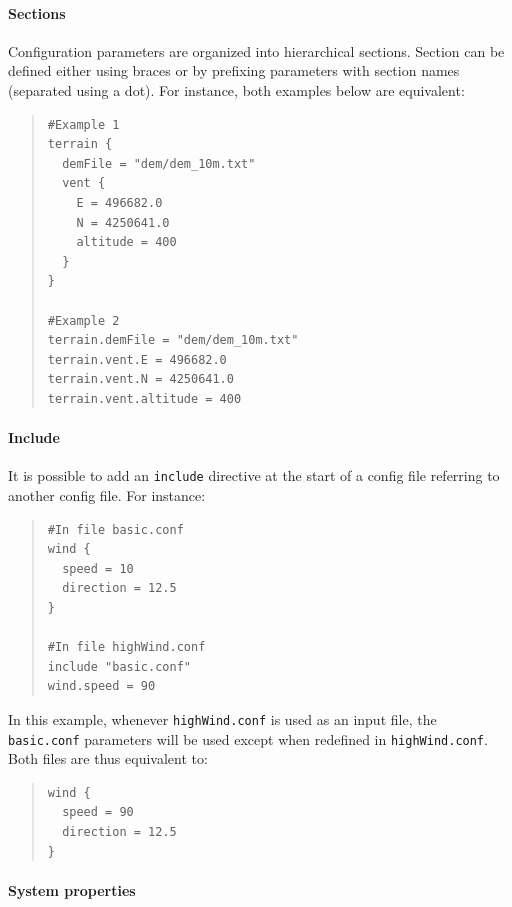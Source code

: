 \documentclass[10pt,a4paper]{article}
\begin{document}
\paragraph{Sections}
\label{sec-4-1-2}

Configuration parameters are organized into hierarchical sections. Section can be defined
either using braces or by prefixing parameters with section names (separated using a dot).
For instance, both examples below are equivalent:

\begin{quote}
\begin{verbatim}
#Example 1
terrain {
  demFile = "dem/dem_10m.txt"
  vent {
    E = 496682.0
    N = 4250641.0
    altitude = 400
  }
}

#Example 2
terrain.demFile = "dem/dem_10m.txt"
terrain.vent.E = 496682.0
terrain.vent.N = 4250641.0
terrain.vent.altitude = 400
\end{verbatim}
\end{quote}

\paragraph{Include}
\label{sec-4-1-3}

It is possible to add an \texttt{include} directive at the start of a config file referring
to another config file. For instance:

\begin{quote}
\begin{verbatim}
#In file basic.conf
wind {
  speed = 10
  direction = 12.5
}

#In file highWind.conf
include "basic.conf"
wind.speed = 90
\end{verbatim}
\end{quote}

In this example, whenever \texttt{highWind.conf} is used as an input file,
the \texttt{basic.conf} parameters will be used except when redefined in \texttt{highWind.conf}.
Both files are thus equivalent to:

\begin{quote}
\begin{verbatim}
wind {
  speed = 90
  direction = 12.5
}
\end{verbatim}
\end{quote}

\paragraph{System properties}
\label{sec-4-1-4}
\end{document}
